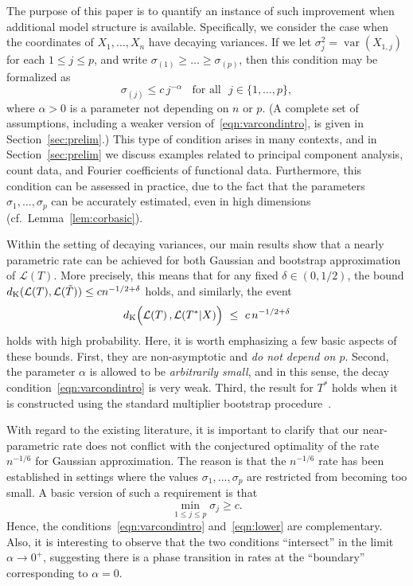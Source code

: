 \documentclass[aos,preprint]{imsart}
\numberwithin{equation}{section}
\theoremstyle{plain}
\newcommand{\dK}{d_{\textup{K}}}
\renewcommand{\L}{\mathcal{L}}
\newcommand{\var}{\operatorname{var}}
\newcommand{\1}{{\bf{1}}}
\newcommand{\0}{\mathbf{0}}
\begin{document}
The purpose of this paper is to quantify an instance of such improvement when additional model structure is available. Specifically, we consider the case when the coordinates of $X_1,\dots,X_n$ have decaying variances. If we let $\sigma_j^2=\var(X_{1,j})$ for each $1\leq j\leq p$, and write $\sigma_{(1)}\geq \dots\geq \sigma_{(p)}$, then this condition may be formalized as
\begin{equation}\label{eqn:varcondintro}
\sigma_{(j)} \leq c \, j^{-\alpha} \ \ \ \ \text{for all} \ \ \ j\in\{1,\dots,p\},
\end{equation}
where $\alpha>0$ is a parameter not depending on $n$ or $p$. (A complete set of assumptions, including a weaker version of~\eqref{eqn:varcondintro}, is given in Section~\ref{sec:prelim}.) This type of condition arises in many contexts, and in Section~\ref{sec:prelim} we discuss examples related to principal component analysis, count data, and Fourier coefficients of functional data. Furthermore, this condition can be assessed in practice, due to the fact that the parameters $\sigma_1,\dots,\sigma_p$ can be accurately estimated, even in high dimensions (cf.~Lemma~\ref{lem:corbasic}).



Within the setting of decaying variances, our main results show that a nearly parametric rate can be achieved for both Gaussian and bootstrap approximation of $\L(T)$. More precisely, this means that for any fixed \mbox{$\delta\in(0,1/2)$}, the bound $\dK( \L(T) , \L(\tilde T))\leq cn^{-1/2+\delta}$ holds, and similarly, the event
\begin{equation}\label{eqn:improved}
%
\dK\Big( \L(T) \, , \L(T^*|X)\Big)  \ \leq  \ c\, n^{-1/2+\delta}
\end{equation}
holds with high probability.
%
Here, it is worth emphasizing a few basic aspects of these bounds. First, they are non-asymptotic and \emph{do not depend on $p$}. Second, the parameter $\alpha$ is allowed to be \emph{arbitrarily small}, and in this sense, the decay condition~\eqref{eqn:varcondintro} is very weak. Third, the result for $T^*$ holds when it is constructed using the standard multiplier bootstrap procedure~\citep{CCK:2013}.


With regard to the existing literature, it is important to clarify that our near-parametric rate does not conflict with the conjectured optimality of the rate $n^{-1/6}$ for Gaussian approximation. The reason is that the $n^{-1/6}$ rate has been established in settings where the values $\sigma_1,\dots,\sigma_p$ are restricted from becoming too small. A basic version of such a requirement is that
\begin{equation}\label{eqn:lower}
\min_{1\leq j\leq p} \sigma_j \geq c.
\end{equation}
Hence, the conditions~\eqref{eqn:varcondintro} and~\eqref{eqn:lower} are complementary. Also, it is interesting to observe that the two conditions ``intersect'' in the limit $\alpha\to 0^+$, suggesting there is a phase transition in rates at the ``boundary'' corresponding to $\alpha=0$.
\end{document}
